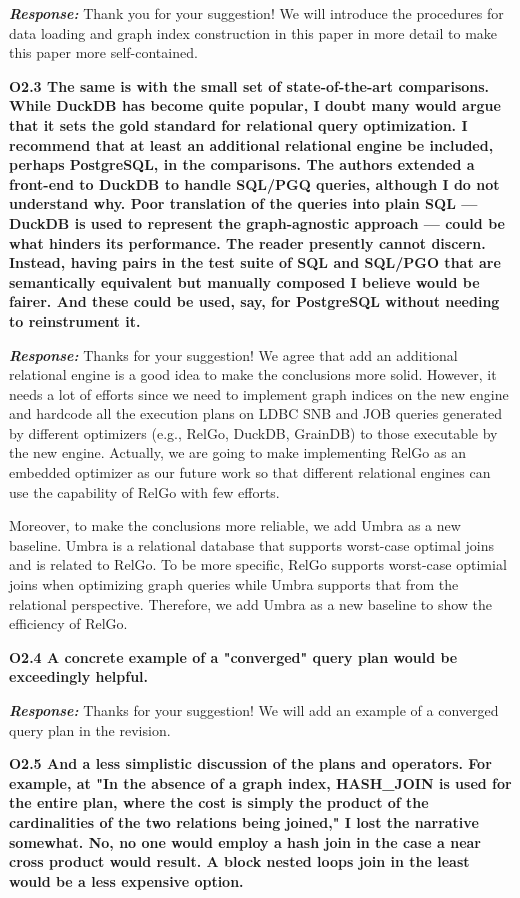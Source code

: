 \textbf{\textit{Response: }}
Thank you for your suggestion! We will introduce the procedures for data loading and graph index construction in this paper in more detail to make this paper more self-contained.

\textbf{ 
O2.3 The same is with the small set of state-of-the-art comparisons. While DuckDB has become quite popular, I doubt many would argue that it sets the gold standard for relational query optimization. I recommend that at least an additional relational engine be included, perhaps PostgreSQL, in the comparisons. The authors extended a front-end to DuckDB to handle SQL/PGQ queries, although I do not understand why. Poor translation of the queries into plain SQL — DuckDB is used to represent the graph-agnostic approach — could be what hinders its performance. The reader presently cannot discern. Instead, having pairs in the test suite of SQL and SQL/PGO that are semantically equivalent but manually composed I believe would be fairer. And these could be used, say, for PostgreSQL without needing to reinstrument it.}

\textbf{\textit{Response: }}
Thanks for your suggestion! We agree that add an additional relational engine is a good idea to make the conclusions more solid. However, it needs a lot of efforts since we need to implement graph indices on the new engine and hardcode all the execution plans on LDBC SNB and JOB queries generated by different optimizers (e.g., RelGo, DuckDB, GrainDB) to those executable by the new engine. Actually, we are going to make implementing RelGo as an embedded optimizer as our future work so that different relational engines can use the capability of RelGo with few efforts.

Moreover, to make the conclusions more reliable, we add Umbra as a new baseline. Umbra is a relational database that supports worst-case optimal joins and is related to RelGo. To be more specific, RelGo supports worst-case optimial joins when optimizing graph queries while Umbra supports that from the relational perspective. Therefore, we add Umbra as a new baseline to show the efficiency of RelGo.


\textbf{
O2.4 A concrete example of a "converged" query plan would be exceedingly helpful.} 

\textbf{\textit{Response: }} 
Thanks for your suggestion! We will add an example of a converged query plan in the revision.


\textbf{
O2.5 And a less simplistic discussion of the plans and operators. For example, at "In the absence of a graph index, HASH\_JOIN is used for the entire plan, where the cost is simply the product of the cardinalities of the two relations being joined," I lost the narrative somewhat. No, no one would employ a hash join in the case a near cross product would result. A block nested loops join in the least would be a less expensive option. }

